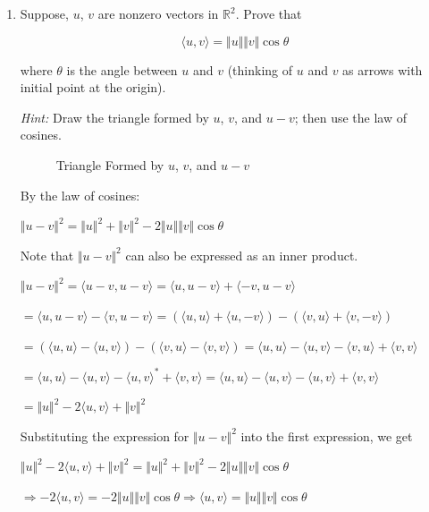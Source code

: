 \documentclass[fleqn]{article}
\makeatletter
\newenvironment{equationCenter}{\@fleqnfalse\begin{equation*}}{\end{equation*}}
\makeatother
\begin{document}
\begin{enumerate}[nolistsep]
		\item Suppose, $u$, $v$ are nonzero vectors in $\mathbb{R}^2$. Prove that
		
			\begin{equationCenter}
				\langle u,v \rangle = \Vert u \Vert \Vert v \Vert \cos \theta
			\end{equationCenter}
			
			where $\theta$ is the angle between $u$ and $v$ (thinking of $u$ and $v$ as arrows with initial point at the origin).
			
			\textit{Hint:} Draw the triangle formed by $u$, $v$, and $u-v$; then use the law of cosines.
			
			\begin{figure}[H]				
			\centerline{}
			\caption{Triangle Formed by $u$, $v$, and $u - v$}
			\label{triangle_prob2}
			\end{figure}
			
			By the law of cosines:
			
			${\Vert u - v \Vert}^2 = {\Vert u \Vert}^2 + {\Vert v \Vert}^2  - 2{\Vert u \Vert}{\Vert v \Vert}\cos\theta$
			
			Note that ${\Vert u - v \Vert}^2$ can also be expressed as an inner product.
			
			${\Vert u - v \Vert}^2 = \langle u - v, u - v \rangle = \langle u, u - v \rangle + \langle -v, u-v \rangle$
			
			$ = \langle u, u - v \rangle - \langle v, u-v \rangle = (\langle u, u \rangle + \langle u, -v \rangle) - (\langle v, u \rangle + \langle v, -v\rangle)$
			
			$ = (\langle u, u \rangle - \langle u, v \rangle) - (\langle v, u \rangle - \langle v, v\rangle) = \langle u, u \rangle - \langle u, v \rangle - \langle v, u \rangle + \langle v, v\rangle$
			
			$ = \langle u, u \rangle - \langle u, v \rangle - {\langle u, v \rangle}^* + \langle v, v\rangle = \langle u, u \rangle - \langle u, v \rangle - {\langle u, v \rangle} + \langle v, v\rangle$
			
			$ = {\Vert u \Vert}^2 - 2\langle u, v \rangle + {\Vert v \Vert}^2$
			
			Substituting the expression for ${\Vert u - v \Vert}^2$ into the first expression, we get
			
			${\Vert u \Vert}^2 - 2\langle u, v \rangle + {\Vert v \Vert}^2 = {\Vert u \Vert}^2 + {\Vert v \Vert}^2  - 2{\Vert u \Vert}{\Vert v \Vert}\cos\theta$
			
			$\Rightarrow - 2\langle u, v \rangle = - 2{\Vert u \Vert}{\Vert v \Vert}\cos\theta \Rightarrow \langle u, v \rangle = {\Vert u \Vert}{\Vert v \Vert}\cos\theta$
			
	\end{enumerate}
\end{document}
